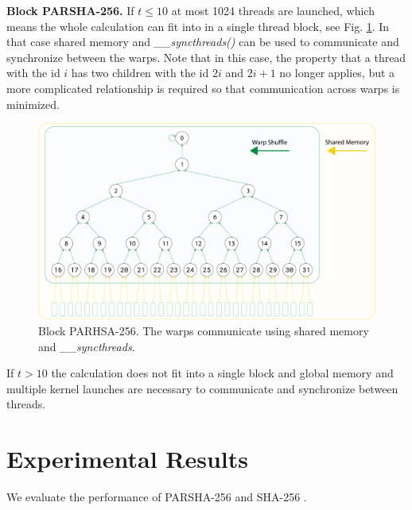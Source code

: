 \documentclass[letterpaper]{article}
\newcommand{\mypar}[1]{{\bf #1.}}
\begin{document}
\mypar{Block PARSHA-256} If $t \leq 10$ at most 1024 threads are launched, which means the whole calculation can fit into in a single thread block, see Fig. \ref{fig:block}. In that case shared memory and \emph{\_\_syncthreads()} can be used to communicate and synchronize between the warps. Note that in this case, the property that a thread with the id $i$ has two children with the id $2i$ and $2i+1$ no longer applies, but a more complicated relationship is required so that communication across warps is minimized.

\begin{figure}[h]\centering
\includegraphics[scale=0.125]{block2.pdf}
  \caption{Block PARHSA-256. The warps communicate using shared memory and \emph{\_\_syncthreads}. \label{fig:block}}
\end{figure}

If $t > 10$ the calculation does not fit into a single block and global memory and multiple kernel launches are necessary to communicate and synchronize between threads.









\section{Experimental Results}\label{sec:exp}
We evaluate the performance of PARSHA-256 and SHA-256 . 
\end{document}
